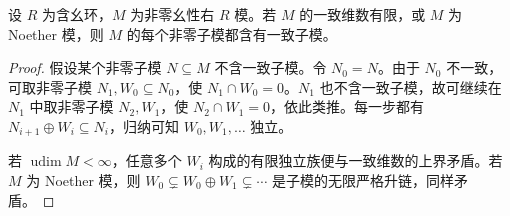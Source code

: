 \begin{lemma}\label{b2:lem:uniform-submodule-existence}
	设 \(R\) 为含幺环，\(M\) 为非零幺性右 \(R\) 模。若 \(M\) 的一致维数有限，或 \(M\) 为 Noether 模，则 \(M\) 的每个非零子模都含有一致子模。
\end{lemma}
\begin{proof}
	假设某个非零子模 \(N\subseteq M\) 不含一致子模。令 \(N_0=N\)。由于 \(N_0\) 不一致，可取非零子模 \(N_1,W_0\subseteq N_0\)，使 \(N_1\cap W_0=0\)。\(N_1\) 也不含一致子模，故可继续在 \(N_1\) 中取非零子模 \(N_2,W_1\)，使 \(N_2\cap W_1=0\)，依此类推。每一步都有 \(N_{i+1}\oplus W_i\subseteq N_i\)，归纳可知 \(W_0,W_1,\ldots\) 独立。

	若 \(\operatorname{udim}M<\infty\)，任意多个 \(W_i\) 构成的有限独立族便与一致维数的上界矛盾。若 \(M\) 为 Noether 模，则 \(W_0\subsetneq W_0\oplus W_1\subsetneq\cdots\) 是子模的无限严格升链，同样矛盾。
\end{proof}

